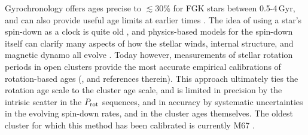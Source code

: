 \documentclass[11pt,twocolumn,tighten]{aastex63}
\begin{document}

Gyrochronology offers ages precise to $\lesssim$30\% for FGK stars
between 0.5-4\,Gyr, and can also provide useful age limits at earlier
times \citep{Bouma_2023}.  The idea of using a star's spin-down as a
clock is quite old
\citep{Skumanich_1972,Noyes_1984,Kawaler_1989,Barnes03,Mamajek_2008,Angus_2015},
and physics-based models for the spin-down itself can clarify many
aspects of how the stellar winds, internal structure, and magnetic
dynamo all evolve
\citep[e.g.][]{Matt_2015,Gallet_Bouvier_2015,Spada_2020}.  Today
however, measurements of stellar rotation periods in open clusters
provide the most accurate empirical calibrations of rotation-based
ages (\citealt{Bouma_2023}, and references therein).  This approach
ultimately ties the rotation age scale to the cluster age scale, and
is limited in precision by the intrisic scatter in the $P_{\rm rot}$
sequences, and in accuracy by systematic uncertainties in the evolving
spin-down rates, and in the cluster ages themselves.  The oldest
cluster for which this method has been calibrated is currently M67
\citep[$\approx$4\,Gyr][]{2022ApJ...938..118D}.
\end{document}
